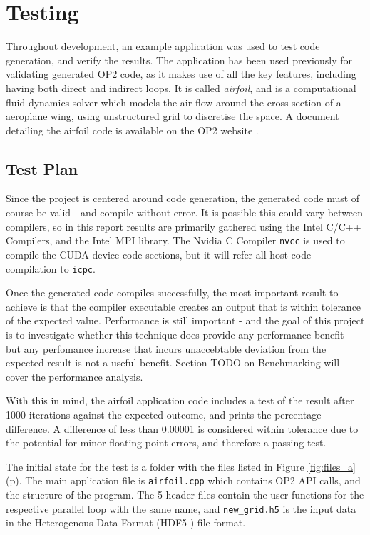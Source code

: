 
\section{Testing}
\label{s:test}
Throughout development, an example application was used to test code generation, and verify the results. The application has been used previously for validating generated OP2 code, as it makes use of all the key features, including having both direct and indirect loops. It is called \textit{airfoil}, and is a computational fluid dynamics solver which models the air flow around the cross section of a aeroplane wing, using unstructured grid to discretise the space. A document detailing the airfoil code is available on the OP2 website \cite{airfoil}.

\subsection{Test Plan}
Since the project is centered around code generation, the generated code must of course be valid - and compile without error. It is possible this could vary between compilers, so in this report results are primarily gathered using the Intel C/C++ Compilers, and the Intel MPI library. The Nvidia C Compiler \verb|nvcc| is used to compile the CUDA device code sections, but it will refer all host code compilation to \verb|icpc|.
\par
Once the generated code compiles successfully, the most important result to achieve is that the compiler executable creates an output that is within tolerance of the expected value. Performance is still important - and the goal of this project is to investigate whether this technique does provide any performance benefit - but any perfomance increase that incurs unaccebtable deviation from the expected result is not a useful benefit. Section TODO on Benchmarking will cover the performance analysis.
\par
With this in mind, the airfoil application code includes a test of the result after 1000 iterations against the expected outcome, and prints the percentage difference. A difference of less than 0.00001 is considered within tolerance due to the potential for minor floating point errors, and therefore a passing test.
\par
The initial state for the test is a folder with the files listed in Figure \ref{fig:files_a} (p\pageref{fig:files_a}). The main application file is \verb|airfoil.cpp| which contains OP2 API calls, and the structure of the program. The 5 header files contain the user functions for the respective parallel loop with the same name, and \verb|new_grid.h5| is the input data in the Heterogenous Data Format (HDF5 \cite{HDF5}) file format.

